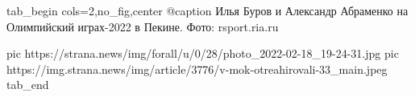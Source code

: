  
 
 
 
 


\ifcmt
  tab_begin cols=2,no_fig,center
		 @caption Илья Буров и Александр Абраменко на Олимпийский играх-2022 в Пекине. Фото: rsport.ria.ru 

     pic https://strana.news/img/forall/u/0/28/photo_2022-02-18_19-24-31.jpg
		 pic https://img.strana.news/img/article/3776/v-mok-otreahirovali-33_main.jpeg
  tab_end
\fi
